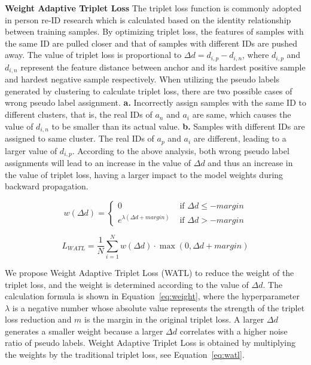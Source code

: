 \documentclass[10pt,twocolumn,letterpaper]{article}
\begin{document}
\noindent \textbf{Weight Adaptive Triplet Loss}
The triplet loss function is commonly adopted in person re-ID research which is calculated based on the identity relationship between training samples. By optimizing triplet loss, the features of samples with the same ID are pulled closer and that of samples with different IDs are pushed away. The value of triplet loss is proportional to $\Delta d = d_{i,p} - d_{i,n}$, where $d_{i,p}$ and $d_{i,n}$ represent the feature distance between anchor and its hardest positive sample and hardest negative sample respectively. When utilizing the pseudo labels generated by clustering to calculate triplet loss, there are two possible cases of wrong pseudo label assignment. \textbf{a.} Incorrectly assign samples with the same ID to different clusters, that is, the real IDs of $a_n$ and $a_i$ are same, which causes the value of $d_{i,n}$ to be smaller than its actual value. \textbf{b.} Samples with different IDs are assigned to same cluster. The real IDs of $a_p$ and $a_i$ are different, leading to a larger value of $d_{i,p}$. According to the above analysis, both wrong pseudo label assignments will lead to an increase in the value of $\Delta d$ and thus an increase in the value of triplet loss, having a larger impact to the model weights during backward propagation.

\begin{equation}
    w(\Delta d)= \begin{cases}0 & \text { if } \Delta d \leq-margin \\ e^{\lambda(\Delta d+margin)} & \text { if } \Delta d>-margin\end{cases}
    \label{eq:weight}
\end{equation}

\begin{equation}
    L_{W A T L} =\frac{1}{N} \sum_{i=1}^{N} w\left(\Delta d\right) \cdot \max \left(0, \Delta d+margin\right)
    \label{eq:watl}
\end{equation}

We propose Weight Adaptive Triplet Loss (WATL) to reduce the weight of the triplet loss, and the weight is determined according to the value of $\Delta d$. The calculation formula is shown in Equation~\ref{eq:weight}, where the hyperparameter $\lambda$ is a negative number whose absolute value represents the strength of the triplet loss reduction and $m$ is the margin in the original triplet loss. A larger $\Delta d$ generates a smaller weight because a larger $\Delta d$ correlates with a higher noise ratio of pseudo labels. Weight Adaptive Triplet Loss is obtained by multiplying the weights by the traditional triplet loss, see Equation~\ref{eq:watl}.
\end{document}
